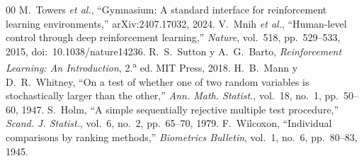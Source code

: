 \documentclass[conference]{IEEEtran}
\begin{document}
\begin{thebibliography}{00}
 M.~Towers \textit{et al.}, ``Gymnasium: A standard interface for reinforcement learning environments,'' arXiv:2407.17032, 2024.
 V.~Mnih \textit{et al.}, ``Human-level control through deep reinforcement learning,'' \textit{Nature}, vol.~518, pp.~529--533, 2015, doi:~10.1038/nature14236.
 R.~S.~Sutton y A.~G.~Barto, \textit{Reinforcement Learning: An Introduction}, 2.\textsuperscript{a} ed. MIT Press, 2018.
 H.~B.~Mann y D.~R.~Whitney, ``On a test of whether one of two random variables is stochastically larger than the other,'' \textit{Ann. Math. Statist.}, vol.~18, no.~1, pp.~50--60, 1947.
 S.~Holm, ``A simple sequentially rejective multiple test procedure,'' \textit{Scand. J. Statist.}, vol.~6, no.~2, pp.~65--70, 1979.
 F.~Wilcoxon, ``Individual comparisons by ranking methods,'' \textit{Biometrics Bulletin}, vol.~1, no.~6, pp.~80--83, 1945.
\end{thebibliography}
\end{document}
